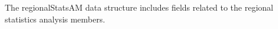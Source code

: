 The regionalStatsAM data structure includes fields related to the regional statistics analysis members.

